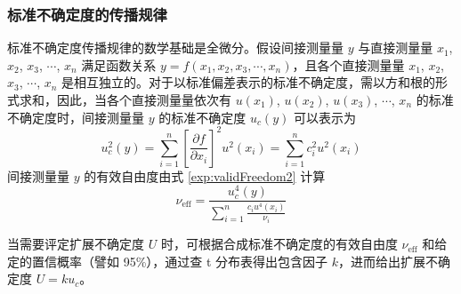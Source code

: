     \subsubsection{标准不确定度的传播规律}
    标准不确定度传播规律的数学基础是全微分。假设间接测量量 $y$ 与直接测量量 $x_1$, $x_2$, $x_3$, $\cdots$, $x_n$ 满足函数关系 $y = f(x_1,x_2,x_3,\cdots,x_n)$，且各个直接测量量 $x_1$, $x_2$, $x_3$, $\cdots$, $x_n$ 是相互独立的。对于以标准偏差表示的标准不确定度，需以方和根的形式求和，因此，当各个直接测量量依次有 $u(x_1)$, $u(x_2)$, $u(x_3)$, $\cdots$, $x_n$ 的标准不确定度时，间接测量量 $y$ 的标准不确定度 $u_c(y)$ 可以表示为
    \begin{equation}
        u_c^2(y)=\sum_{i=1}^{n}\left[\frac{\partial f}{\partial x_i}\right]^{2}u^2\left(x_{i}\right)=\sum_{i=1}^{n}c_i^2 u^2\left(x_{i}\right) \label{exp:uncertaintyPropagation}
    \end{equation}
    间接测量量 $y$ 的有效自由度由式 \ref{exp:validFreedom2} 计算
    \begin{equation}
        \nu_\text{eff}=\frac{u_c^4(y)}{\displaystyle\sum_{i=1}^{n}\frac{c_i u^4(x_i)}{\nu_i}} \label{exp:validFreedom2}
    \end{equation}

    当需要评定扩展不确定度 $U$ 时，可根据合成标准不确定度的有效自由度 $\nu_\text{eff}$ 和给定的置信概率（譬如 95\%），通过查 t 分布表得出包含因子 $k$，进而给出扩展不确定度 $U = k u_c$。
